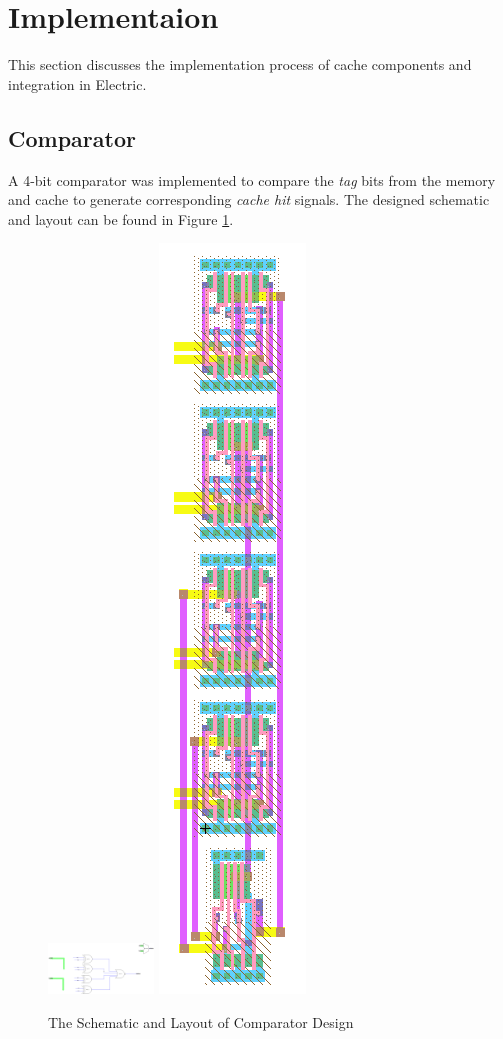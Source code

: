 \documentclass[conference]{IEEEtran}
\begin{document}
\section{Implementaion}\label{implementation}
This section discusses the implementation process of cache components and integration in Electric.
\subsection{Comparator}\label{subsec:comparator}
A 4-bit comparator was implemented to compare the \textit{tag} bits from the memory and cache to generate corresponding \textit{cache hit} signals. The designed schematic and layout can be found in Figure \ref{fig:comparator}.
\begin{figure}[h!]
  \centering
    \includegraphics[width=0.25\textwidth]{comparator_sch} \includegraphics[scale=0.25]{comparator_layout}
  \caption{The Schematic and Layout of Comparator Design}
  \label{fig:comparator}
\end{figure}
\end{document}
